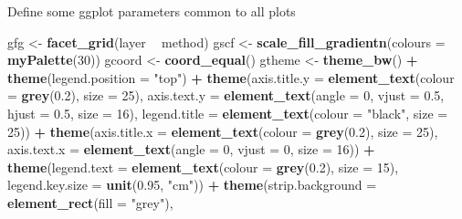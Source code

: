 \documentclass[]{book}
\newenvironment{Shaded}{\begin{snugshade}}{\end{snugshade}}
\newcommand{\DataTypeTok}[1]{\textcolor[rgb]{0.13,0.29,0.53}{#1}}
\newcommand{\DecValTok}[1]{\textcolor[rgb]{0.00,0.00,0.81}{#1}}
\newcommand{\FloatTok}[1]{\textcolor[rgb]{0.00,0.00,0.81}{#1}}
\newcommand{\KeywordTok}[1]{\textcolor[rgb]{0.13,0.29,0.53}{\textbf{#1}}}
\newcommand{\NormalTok}[1]{#1}
\newcommand{\OperatorTok}[1]{\textcolor[rgb]{0.81,0.36,0.00}{\textbf{#1}}}
\newcommand{\StringTok}[1]{\textcolor[rgb]{0.31,0.60,0.02}{#1}}
\begin{document}
Define some ggplot parameters common to all plots

\begin{Shaded}
\begin{Highlighting}[]
\NormalTok{gfg <-}\StringTok{ }\KeywordTok{facet_grid}\NormalTok{(layer }\OperatorTok{~}\StringTok{ }\NormalTok{method)}
\NormalTok{gscf <-}\StringTok{ }\KeywordTok{scale_fill_gradientn}\NormalTok{(}\DataTypeTok{colours =} \KeywordTok{myPalette}\NormalTok{(}\DecValTok{30}\NormalTok{))}
\NormalTok{gcoord <-}\StringTok{ }\KeywordTok{coord_equal}\NormalTok{()}
\NormalTok{gtheme <-}\StringTok{ }\KeywordTok{theme_bw}\NormalTok{() }\OperatorTok{+}\StringTok{ }\KeywordTok{theme}\NormalTok{(}\DataTypeTok{legend.position =} \StringTok{"top"}\NormalTok{) }\OperatorTok{+}\StringTok{ }\KeywordTok{theme}\NormalTok{(}\DataTypeTok{axis.title.y =} \KeywordTok{element_text}\NormalTok{(}\DataTypeTok{colour =} \KeywordTok{grey}\NormalTok{(}\FloatTok{0.2}\NormalTok{), }
                    \DataTypeTok{size =} \DecValTok{25}\NormalTok{), }\DataTypeTok{axis.text.y =} \KeywordTok{element_text}\NormalTok{(}\DataTypeTok{angle =} \DecValTok{0}\NormalTok{, }\DataTypeTok{vjust =} \FloatTok{0.5}\NormalTok{, }\DataTypeTok{hjust =} \FloatTok{0.5}\NormalTok{, }
                    \DataTypeTok{size =} \DecValTok{16}\NormalTok{), }\DataTypeTok{legend.title =} \KeywordTok{element_text}\NormalTok{(}\DataTypeTok{colour =} \StringTok{"black"}\NormalTok{, }\DataTypeTok{size =} \DecValTok{25}\NormalTok{)) }\OperatorTok{+}\StringTok{ }
\StringTok{                    }\KeywordTok{theme}\NormalTok{(}\DataTypeTok{axis.title.x =} \KeywordTok{element_text}\NormalTok{(}\DataTypeTok{colour =} \KeywordTok{grey}\NormalTok{(}\FloatTok{0.2}\NormalTok{), }\DataTypeTok{size =} \DecValTok{25}\NormalTok{), }\DataTypeTok{axis.text.x =} \KeywordTok{element_text}\NormalTok{(}\DataTypeTok{angle =} \DecValTok{0}\NormalTok{, }
                                        \DataTypeTok{vjust =} \DecValTok{0}\NormalTok{, }\DataTypeTok{size =} \DecValTok{16}\NormalTok{)) }\OperatorTok{+}\StringTok{ }\KeywordTok{theme}\NormalTok{(}\DataTypeTok{legend.text =} \KeywordTok{element_text}\NormalTok{(}\DataTypeTok{colour =} \KeywordTok{grey}\NormalTok{(}\FloatTok{0.2}\NormalTok{), }
                    \DataTypeTok{size =} \DecValTok{15}\NormalTok{), }\DataTypeTok{legend.key.size =} \KeywordTok{unit}\NormalTok{(}\FloatTok{0.95}\NormalTok{, }\StringTok{"cm"}\NormalTok{)) }\OperatorTok{+}\StringTok{ }\KeywordTok{theme}\NormalTok{(}\DataTypeTok{strip.background =} \KeywordTok{element_rect}\NormalTok{(}\DataTypeTok{fill =} \StringTok{"grey"}\NormalTok{), }

\end{Highlighting}
\end{Shaded}
\end{document}
